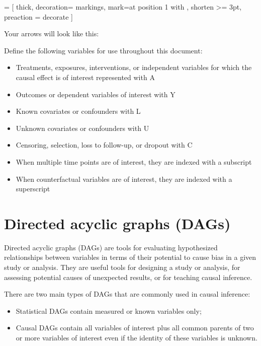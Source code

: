 \documentclass[a4paper]{report}
\begin{document}
 = [
	thick, 
	decoration={
		markings,
		mark=at position 1 with {
			}
		}, 
	shorten >= 3pt, preaction = {decorate}
	]
	
\vspace{3mm}	
Your arrows will look like this:

\vspace{3mm}

Define the following variables for use throughout this document:
\begin{itemize}
\item Treatments, exposures, interventions, or independent variables for which the causal effect is of interest  represented with A
\item Outcomes or dependent variables of interest with Y
\item Known covariates or confounders with L
\item Unknown covariates or confounders with U
\item Censoring, selection, loss to follow-up, or dropout with C
\item When multiple time points are of interest, they are indexed with a subscript
\item When counterfactual variables are of interest, they are indexed with a superscript
\end{itemize}

\vspace{5mm}

\chapter{Directed acyclic graphs (DAGs) }
Directed acyclic graphs (DAGs) are tools for evaluating hypothesized relationships between variables in terms of their potential to cause bias in a given study or analysis. They are useful tools for designing a study or analysis, for assessing potential causes of unexpected results, or for teaching causal inference. 
\vspace{3mm}

There are two main types of DAGs that are commonly used in causal inference:
\begin{itemize}
\item Statistical DAGs contain measured or known variables only;
\item Causal DAGs contain all variables of interest plus all common parents of two or more variables of interest even if the identity of these variables is unknown. 
\end{itemize}
\vspace{3mm}
\end{document}
